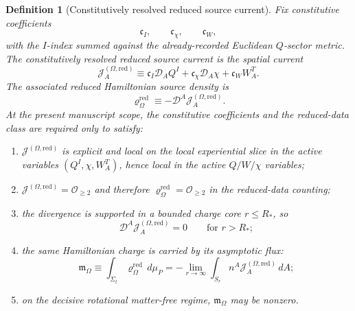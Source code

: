 \documentclass[11pt]{article}
\newcommand{\SpatialD}{\mathcal D}
\newcommand{\SourceDensityRed}{\varrho_\Omega^{\mathrm{red}}}
\newcommand{\SourceCurrentRed}{\mathcal J^{(\Omega,\mathrm{red})}}
\newcommand{\HamChargeOmega}{\mathfrak m_\Omega}
\newtheorem{definition}{Definition}
\begin{document}
\begin{definition}[Constitutively resolved reduced source current]
\label{def:constitutivecurrent}
Fix constitutive coefficients
\begin{equation}
\mathfrak c_I,
\qquad
\mathfrak c_\chi,
\qquad
\mathfrak c_W,
\label{eq:cconst}
\end{equation}
with the \(I\)-index summed against the already-recorded Euclidean \(Q\)-sector metric. The \emph{constitutively resolved reduced source current} is the spatial current
\begin{equation}
\SourceCurrentRed_A
\equiv
\mathfrak c_I\SpatialD_AQ^I
+\mathfrak c_\chi\SpatialD_A\chi
+\mathfrak c_WW_A^T.
\label{eq:Jredexplicit}
\end{equation}
The associated reduced Hamiltonian source density is
\begin{equation}
\SourceDensityRed
\equiv
-\SpatialD^A\SourceCurrentRed_A.
\label{eq:rhorfromJ}
\end{equation}
At the present manuscript scope, the constitutive coefficients and the reduced-data class are required only to satisfy:
\begin{enumerate}
    \item \(\SourceCurrentRed\) is explicit and local on the local experiential slice in the active variables \((Q^I,\chi,W_A^T)\), hence local in the active \(Q/W/\chi\) variables;
    \item \(\SourceCurrentRed=\mathcal O_{\ge 2}\) and therefore \(\SourceDensityRed=\mathcal O_{\ge 2}\) in the reduced-data counting;
    \item the divergence is supported in a bounded charge core \(r\le R_\ast\), so
    \begin{equation}
    \SpatialD^A\SourceCurrentRed_A=0
    \qquad
    \text{for } r>R_\ast;
    \label{eq:exteriorcurrent}
    \end{equation}
    \item the same Hamiltonian charge is carried by its asymptotic flux:
    \begin{equation}
    \HamChargeOmega
    \equiv
    \int_{\Sigma_t}\SourceDensityRed\,d\mu_P
    =
    -\lim_{r\to\infty}\int_{S_r}n^A\SourceCurrentRed_A\,dA;
    \label{eq:charge}
    \end{equation}
    \item on the decisive rotational matter-free regime, \(\HamChargeOmega\) may be nonzero.
\end{enumerate}
\end{definition}
\end{document}
